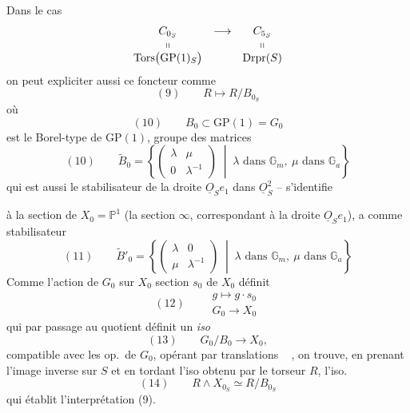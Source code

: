 \documentclass[11pt,a4paper]{article}
\begin{document}
Dans le cas
\[
  \begin{array}{ccc}
    C_{0_S} & \longrightarrow & C_{5_S} \\
    \shortparallel & & \shortparallel \\
    \mathrm{Tors}\bigl(\mathrm{GP}(1)_S\bigr) & & \mathrm{Drpr}(S)
  \end{array}
\]
on peut expliciter aussi ce foncteur comme
\[
  (9) \qquad R \longmapsto R/B_{0_S}
\]
où
\[
  (10) \qquad B_0 \subset \mathrm{GP}(1) = G_0
\]
est le Borel-type de $\mathrm{GP}(1)$,  
  
groupe des matrices
\[
  (10) \qquad \widetilde{B}_0 = \left\lbrace \begin{pmatrix} \lambda & \mu \\ 0 & \lambda^{-1} \end{pmatrix}
  \;\middle|\; \lambda \text{ dans } \mathbb{G}_m,\ \mu \text{ dans } \mathbb{G}_a \right\rbrace
\]
\struck{\ill{}} qui est aussi le stabilisateur de la droite $\underline{O}_S e_1$ dans
$\underline{O}^2_S$ -- s'identifie

à la section  \struck{$\bullet$} de 
$X_0 = \mathbb{P}^1$ (la section $\infty$, correspondant à la droite
$\underline{O}_S e_1$), a comme stabilisateur
\[
  (11) \qquad \widetilde{B}'_0 = \left\lbrace \begin{pmatrix} \lambda & 0 \\ \mu & \lambda^{-1} \end{pmatrix}
  \;\middle|\; \lambda \text{ dans } \mathbb{G}_m,\ \mu \text{ dans } \mathbb{G}_a \right\rbrace
\]
Comme l'action de $G_0$ sur $X_0$   
section $s_0$ de $X_0$ définit
\[
  (12) \qquad \begin{array}{c} g \longmapsto g \cdot s_0 \\ G_0 \longrightarrow X_0 \end{array}
\]
qui par passage au quotient définit un \emph{iso}
\[
  (13) \qquad G_0/B_0 \longrightarrow X_0 ,
\]
 compatible avec les op.\ de $G_0$, opérant par translations
\  , on trouve, en prenant l'image
inverse sur $S$ et en tordant l'iso obtenu par le torseur $R$, l'iso.
\[
  (14) \qquad R \wedge X_{0_S} \simeq R/B_{0_S}
\]
qui établit l'interprétation (9).
\end{document}
